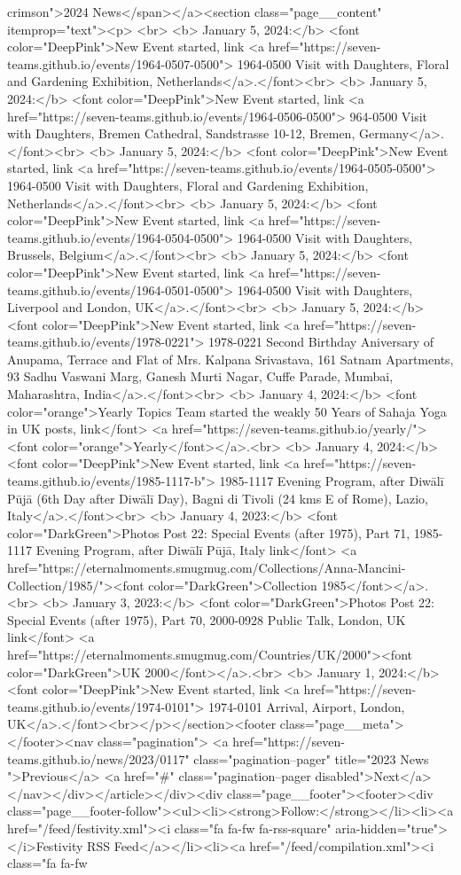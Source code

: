crimson">2024 News</span></a><section class="page__content" itemprop="text"><p> <br> <b> January 5, 2024:</b> <font color="DeepPink">New Event started, link <a href="https://seven-teams.github.io/events/1964-0507-0500"> 1964-0500 Visit with Daughters, Floral and Gardening Exhibition, Netherlands</a>.</font><br> <b> January 5, 2024:</b> <font color="DeepPink">New Event started, link <a href="https://seven-teams.github.io/events/1964-0506-0500"> 964-0500 Visit with Daughters, Bremen Cathedral, Sandstrasse 10-12, Bremen, Germany</a>.</font><br> <b> January 5, 2024:</b> <font color="DeepPink">New Event started, link <a href="https://seven-teams.github.io/events/1964-0505-0500"> 1964-0500 Visit with Daughters, Floral and Gardening Exhibition, Netherlands</a>.</font><br> <b> January 5, 2024:</b> <font color="DeepPink">New Event started, link <a href="https://seven-teams.github.io/events/1964-0504-0500"> 1964-0500 Visit with Daughters, Brussels, Belgium</a>.</font><br> <b> January 5, 2024:</b> <font color="DeepPink">New Event started, link <a href="https://seven-teams.github.io/events/1964-0501-0500"> 1964-0500 Visit with Daughters, Liverpool and London, UK</a>.</font><br> <b> January 5, 2024:</b> <font color="DeepPink">New Event started, link <a href="https://seven-teams.github.io/events/1978-0221"> 1978-0221 Second Birthday Aniversary of Anupama, Terrace and Flat of Mrs. Kalpana Srivastava, 161 Satnam Apartments, 93 Sadhu Vaswani Marg, Ganesh Murti Nagar, Cuffe Parade, Mumbai, Maharashtra, India</a>.</font><br> <b> January 4, 2024:</b> <font color="orange">Yearly Topics Team started the weakly 50 Years of Sahaja Yoga in UK posts, link</font> <a href="https://seven-teams.github.io/yearly/"> <font color="orange">Yearly</font></a>.<br> <b> January 4, 2024:</b> <font color="DeepPink">New Event started, link <a href="https://seven-teams.github.io/events/1985-1117-b"> 1985-1117 Evening Program, after Diwālī Pūjā (6th Day after Diwālī Day), Bagni di Tivoli (24 kms E of Rome), Lazio, Italy</a>.</font><br> <b> January 4, 2023:</b> <font color="DarkGreen">Photos Post 22: Special Events (after 1975), Part 71, 1985-1117 Evening Program, after Diwālī Pūjā, Italy link</font> <a href="https://eternalmoments.smugmug.com/Collections/Anna-Mancini-Collection/1985/"><font color="DarkGreen">Collection 1985</font></a>.<br> <b> January 3, 2023:</b> <font color="DarkGreen">Photos Post 22: Special Events (after 1975), Part 70, 2000-0928 Public Talk, London, UK link</font> <a href="https://eternalmoments.smugmug.com/Countries/UK/2000"><font color="DarkGreen">UK 2000</font></a>.<br> <b> January 1, 2024:</b> <font color="DeepPink">New Event started, link <a href="https://seven-teams.github.io/events/1974-0101"> 1974-0101 Arrival, Airport, London, UK</a>.</font><br></p></section><footer class="page__meta"></footer><nav class="pagination"> <a href="https://seven-teams.github.io/news/2023/0117" class="pagination--pager" title="2023 News ">Previous</a> <a href="#" class="pagination--pager disabled">Next</a></nav></div></article></div><div class="page__footer"><footer><div class="page__footer-follow"><ul><li><strong>Follow:</strong></li><li><a href="/feed/festivity.xml"><i class="fa fa-fw fa-rss-square" aria-hidden="true"></i>Festivity RSS Feed</a></li><li><a href="/feed/compilation.xml"><i class="fa fa-fw 